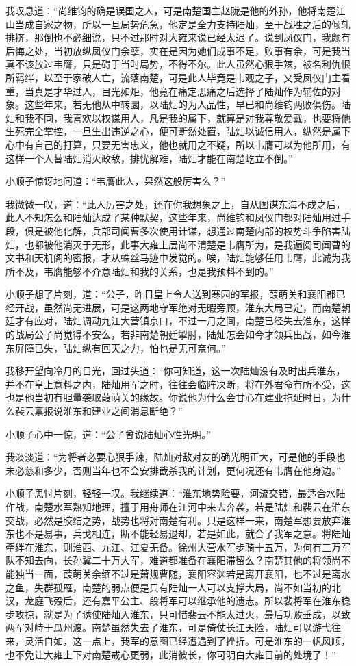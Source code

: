 我叹息道：“尚维钧的确是误国之人，可是南楚国主赵陇是他的外孙，他将南楚江山当成自家之物，所以一旦局势危急，他定是全力支持陆灿，至于战胜之后的倾轧排挤，那倒也不必细说，只不过那时对大雍来说已经太迟了。说到凤仪门，我颇有后悔之处，当初放纵凤仪门余孽，实在是因为她们成事不足，败事有余，可是我当真不该放过韦膺，只是碍于当时局势，不得不尔。此人虽然心狠手辣，被名利仇恨所羁绊，以至于家破人亡，流落南楚，可是此人毕竟是韦观之子，又受凤仪门主看重，当真是才华过人，目光如炬，他竟在痛定思痛之后选择了陆灿作为辅佐的对象。这些年来，若无他从中转圜，以陆灿的为人品性，早已和尚维钧两败俱伤。陆灿和我不同，我喜欢以权谋用人，凡是我的属下，就算是对我尊敬爱戴，也要将他生死完全掌控，一旦生出违逆之心，便可断然处置，陆灿以诚信用人，纵然是属下心中有自己的打算，只要无害忠义，他也就用之不疑，所以韦膺可以为他所用，有这样一个人替陆灿消灭政敌，排忧解难，陆灿才能在南楚屹立不倒。”

小顺子惊讶地问道：“韦膺此人，果然这般厉害么？”

我微微一叹，道：“此人厉害之处，还在你我想象之上，自从图谋东海不成之后，此人不知怎么和陆灿达成了某种默契，这些年来，尚维钧和凤仪门都对陆灿用过手段，俱是被他化解，兵部司闻曹多次使用计谋，想通过南楚内部的权势斗争陷害陆灿，也都被他消灭于无形，此事大雍上层尚不清楚是韦膺所为，是我遍阅司闻曹的文书和天机阁的密报，才从蛛丝马迹中发觉的。唉，陆灿能够任用韦膺，此诚为我所不及，韦膺能够不介意陆灿和我的关系，也是我预料不到的。”

小顺子想了片刻，道：“公子，昨日皇上令人送到寒园的军报，葭萌关和襄阳都已经开战，虽然尚无进展，可是这两地守军绝对无暇旁顾，淮东大局已定，而南楚朝廷才有应对，陆灿调动九江大营镇京口，不过一月之间，南楚已经失去淮东，这样的战局公子尚觉得不安么，若非南楚朝廷掣肘，陆灿怎会如今才领兵出战，如今淮东屏障已失，陆灿纵有回天之力，怕也是无可奈何。”

我移开望向冷月的目光，回过头道：“你可知道，这一次陆灿没有及时出兵淮东，并不在皇上意料之内，陆灿用军之时，往往会临阵决断，将在外君命有所不受，这也是他当初有胆量袭取葭萌关的缘故。你说他为什么会甘心在建业拖延时日，为什么裴云禀报说淮东和建业之间消息断绝？”

小顺子心中一惊，道：“公子曾说陆灿心性光明。”

我淡淡道：“为将者必要心狠手辣，陆灿对敌对友的确光明正大，可是他的手段也未必慈和多少，否则当年也不会安排截杀我的计划，更何况还有韦膺在他身边。”

小顺子思忖片刻，轻轻一叹。我继续道：“淮东地势险要，河流交错，最适合水陆作战，南楚水军熟知地理，擅于用舟师在江河中来去奔袭，若是陆灿和裴云在淮东交战，必然是胶结之势，战势也将对南楚有利。只是这样一来，南楚军想要放弃淮东也不是易事，兵戈相连，断不能轻易退却，若是如此，就合了我军之意。将陆灿牵绊在淮东，则淮西、九江、江夏无备。徐州大营水军步骑十五万，为何有三万军队不知去向，长孙冀二十万大军，难道都准备在襄阳滞留么？南楚其他的将领尚不能独当一面，葭萌关余缅不过是萧规曹随，襄阳容渊若是离开襄阳，也不过是离水之鱼，失群孤雁，南楚的弱点便是只有陆灿一人可以支撑大局，尚不如当初的北汉，龙庭飞殁后，还有嘉平公主、段将军可以继承他的遗志。所以裴将军在淮东稳步攻掠，就是为了诱使陆灿入淮东，只可惜裴云不能太过火，最后功败垂成，以致两军对峙于瓜州渡。南楚虽然失去了淮东，可是倚仗长江天险，陆灿可以游弋往来，灵活自如，这一点上，我军的意图已经遭遇到了挫折。可是淮东的一帆风顺，也不免让大雍上下对南楚戒心更弱，此消彼长，你可明白大雍目前的处境了！”

